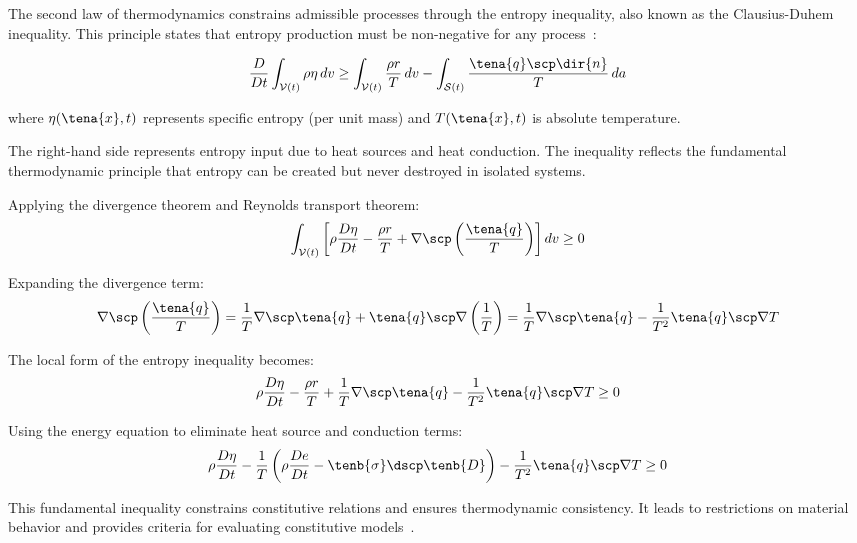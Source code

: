 The second law of thermodynamics constrains admissible processes through the entropy inequality, also known as the Clausius-Duhem inequality. This principle states that entropy production must be non-negative for any process~\autocite{Sadd.2019}:

\begin{equation}
\frac{D}{Dt}\int_{\mathcal{V}(t)} \rho \eta \, dv \geq \int_{\mathcal{V}(t)} \frac{\rho r}{T} \, dv - \int_{\mathcal{S}(t)} \frac{\tena{q} \scp \dir{n}}{T} \, da
\end{equation}

where $\eta(\tena{x}, t)$ represents specific entropy (per unit mass) and $T(\tena{x}, t)$ is absolute temperature.

The right-hand side represents entropy input due to heat sources and heat conduction. The inequality reflects the fundamental thermodynamic principle that entropy can be created but never destroyed in isolated systems.

Applying the divergence theorem and Reynolds transport theorem:
\begin{equation}
\int_{\mathcal{V}(t)} \left[\rho \frac{D\eta}{Dt} - \frac{\rho r}{T} + \nabla \scp \left(\frac{\tena{q}}{T}\right)\right] dv \geq 0
\end{equation}

Expanding the divergence term:
\begin{equation}
\nabla \scp \left(\frac{\tena{q}}{T}\right) = \frac{1}{T}\nabla \scp \tena{q} + \tena{q} \scp \nabla\left(\frac{1}{T}\right) = \frac{1}{T}\nabla \scp \tena{q} - \frac{1}{T^2}\tena{q} \scp \nabla T
\end{equation}

The local form of the entropy inequality becomes:
\begin{equation}
\rho \frac{D\eta}{Dt} - \frac{\rho r}{T} + \frac{1}{T}\nabla \scp \tena{q} - \frac{1}{T^2}\tena{q} \scp \nabla T \geq 0
\end{equation}

Using the energy equation to eliminate heat source and conduction terms:
\begin{equation}
\rho \frac{D\eta}{Dt} - \frac{1}{T}\left(\rho \frac{De}{Dt} - \tenb{\sigma} \dscp \tenb{D}\right) - \frac{1}{T^2}\tena{q} \scp \nabla T \geq 0
\end{equation}

This fundamental inequality constrains constitutive relations and ensures thermodynamic consistency. It leads to restrictions on material behavior and provides criteria for evaluating constitutive models~\autocite{Sadd.2019}.

